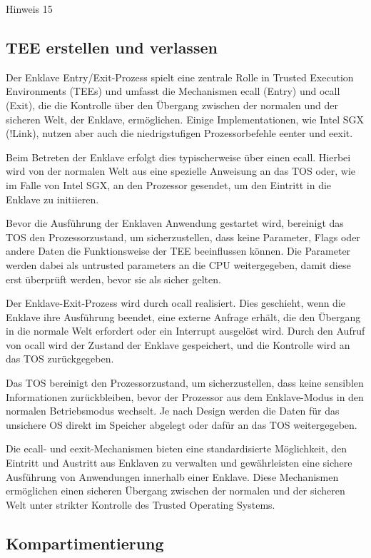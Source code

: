 Hinweis 15

\subsection{TEE erstellen und verlassen}

Der Enklave Entry/Exit-Prozess spielt eine zentrale Rolle in Trusted Execution Environments (TEEs) und umfasst die Mechanismen ecall (Entry) und ocall (Exit), die die Kontrolle über den Übergang zwischen der normalen und der sicheren Welt, der Enklave, ermöglichen. Einige Implementationen, wie Intel SGX (!Link), nutzen aber auch die niedrigstufigen Prozessorbefehle eenter und eexit.

Beim Betreten der Enklave erfolgt dies typischerweise über einen ecall. Hierbei wird von der normalen Welt aus eine spezielle Anweisung an das TOS oder, wie im Falle von Intel SGX, an den Prozessor gesendet, um den Eintritt in die Enklave zu initiieren. 

Bevor die Ausführung der Enklaven Anwendung gestartet wird, bereinigt das TOS den Prozessorzustand, um sicherzustellen, dass keine Parameter, Flags oder andere Daten die Funktionsweise der TEE beeinflussen können. Die Parameter werden dabei als untrusted parameters an die CPU weitergegeben, damit diese erst überprüft werden, bevor sie als sicher gelten.

Der Enklave-Exit-Prozess wird durch ocall realisiert. Dies geschieht, wenn die Enklave ihre Ausführung beendet, eine externe Anfrage erhält, die den Übergang in die normale Welt erfordert oder ein Interrupt ausgelöst wird. Durch den Aufruf von ocall wird der Zustand der Enklave gespeichert, und die Kontrolle wird an das TOS zurückgegeben. 

Das TOS bereinigt den Prozessorzustand, um sicherzustellen, dass keine sensiblen Informationen zurückbleiben, bevor der Prozessor aus dem Enklave-Modus in den normalen Betriebsmodus wechselt. Je nach Design werden die Daten für das unsichere OS direkt im Speicher abgelegt oder dafür an das TOS weitergegeben.

Die ecall- und eexit-Mechanismen bieten eine standardisierte Möglichkeit, den Eintritt und Austritt aus Enklaven zu verwalten und gewährleisten eine sichere Ausführung von Anwendungen innerhalb einer Enklave. Diese Mechanismen ermöglichen einen sicheren Übergang zwischen der normalen und der sicheren Welt unter strikter Kontrolle des Trusted Operating Systems.

\subsection{Kompartimentierung}

